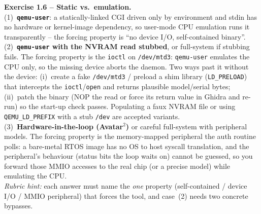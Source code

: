 \documentclass[11pt,a4paper]{article}
\begin{document}
\begin{solutionbox}
\textbf{Exercise 1.6 -- Static vs.\ emulation.}\\[2pt]
(1)~\textbf{\texttt{qemu-user}}: a statically-linked CGI driven only by environment and stdin has
no hardware or kernel-image dependency, so user-mode CPU emulation runs it transparently -- the
forcing property is ``no device I/O, self-contained binary''.\\[2pt]
(2)~\textbf{\texttt{qemu-user} with the NVRAM read stubbed}, or full-system if stubbing fails.
The forcing property is the \texttt{ioctl} on \texttt{/dev/mtd3}: \texttt{qemu-user} emulates the
CPU only, so the missing device aborts the daemon. Two ways past it without the device: (i)~create
a fake \texttt{/dev/mtd3} / preload a shim library (\texttt{LD\_PRELOAD}) that intercepts the
\texttt{ioctl}/\texttt{open} and returns plausible model/serial bytes; (ii)~patch the binary (NOP
the read or force its return value in Ghidra and re-run) so the start-up check passes. Populating
a faux NVRAM file or using \texttt{QEMU\_LD\_PREFIX} with a stub \texttt{/dev} are accepted
variants.\\[2pt]
(3)~\textbf{Hardware-in-the-loop (Avatar$^2$)} or careful full-system with peripheral models. The
forcing property is the memory-mapped peripheral the auth routine polls: a bare-metal RTOS image
has no OS to host syscall translation, and the peripheral's behaviour (status bits the loop waits
on) cannot be guessed, so you forward those MMIO accesses to the real chip (or a precise model)
while emulating the CPU.\\[2pt]
\emph{Rubric hint:} each answer must name the \emph{one} property (self-contained / device I/O /
MMIO peripheral) that forces the tool, and case~(2) needs two concrete bypasses.
\end{solutionbox}
\end{document}
